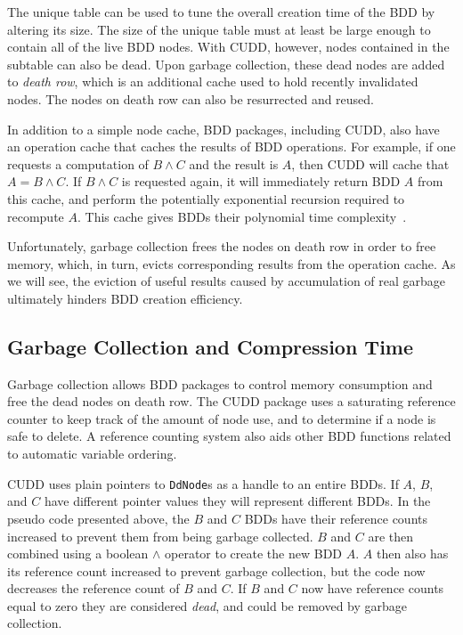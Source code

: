 {The unique table can be used to tune the overall creation time of the BDD by altering its size.  The size of the unique table must at least be large enough to contain all of the live BDD nodes.  With CUDD, however, nodes contained in the subtable can also be dead. Upon garbage collection, these dead nodes are added to \textit{death row}, which is an additional cache used to hold recently invalidated nodes. The nodes on death row can also be resurrected and reused.

In addition to a simple node cache, BDD packages, including CUDD, also have an operation cache that caches the results of BDD operations. For example, if one requests a computation of $B \land C$ and the result is $A$, then CUDD will cache that $A = B \land C$.  If $B \land C$ is requested again, it will immediately return BDD $A$ from this cache, and perform the potentially exponential recursion required to recompute $A$.  This cache gives BDDs their polynomial time complexity~\cite{bryant:86:ieeetc}.

Unfortunately, garbage collection frees the nodes on death row in order to free memory, which, in turn, evicts corresponding results from the operation cache.  As we will see, the eviction of useful results caused by accumulation of real garbage ultimately hinders BDD creation efficiency.

\subsection{Garbage Collection and Compression Time}

Garbage collection allows BDD packages to control memory consumption and free the dead nodes on death row.  The CUDD package uses a saturating reference counter to keep track of the amount of node use, and to determine if a node is safe to delete.  A reference counting system also aids other BDD functions related to automatic variable ordering.

CUDD uses plain pointers to \texttt{DdNode}s as a handle to an entire BDDs.  If $A$, $B$, and $C$ have different pointer values they will represent different BDDs.  In the pseudo code presented above, the $B$ and $C$ BDDs have their reference counts increased to prevent them from being garbage collected.  $B$ and $C$ are then combined using a boolean $\land$ operator to create the new BDD $A$.  $A$ then also has its reference count increased to prevent garbage collection, but the code now decreases the reference count of $B$ and $C$.  If $B$ and $C$ now have reference counts equal to zero they are considered \textit{dead}, and could be removed by garbage collection.

}
